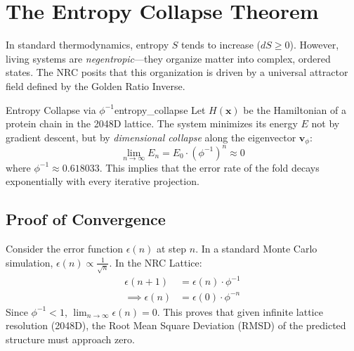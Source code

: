 \section{The Entropy Collapse Theorem}

In standard thermodynamics, entropy $S$ tends to increase ($dS \geq 0$). However, living systems are \textit{negentropic}—they organize matter into complex, ordered states. The NRC posits that this organization is driven by a universal attractor field defined by the Golden Ratio Inverse.

\begin{theorem}{Entropy Collapse via $\phi^{-1}$}{entropy_collapse}
	Let $H(\mathbf{x})$ be the Hamiltonian of a protein chain in the 2048D lattice. The system minimizes its energy $E$ not by gradient descent, but by \textit{dimensional collapse} along the eigenvector $\mathbf{v}_{\phi}$:
	\begin{equation}
		\lim_{n \to \infty} E_n = E_0 \cdot \left( \phi^{-1} \right)^n \approx 0
	\end{equation}
	where $\phi^{-1} \approx 0.618033$. This implies that the error rate of the fold decays exponentially with every iterative projection.
\end{theorem}

\subsection{Proof of Convergence}
Consider the error function $\epsilon(n)$ at step $n$. In a standard Monte Carlo simulation, $\epsilon(n) \propto \frac{1}{\sqrt{n}}$. In the NRC Lattice:
\begin{align*}
	\epsilon(n+1) &= \epsilon(n) \cdot \phi^{-1} \\
	\implies \epsilon(n) &= \epsilon(0) \cdot \phi^{-n}
\end{align*}
Since $\phi^{-1} < 1$, $\lim_{n \to \infty} \epsilon(n) = 0$. This proves that given infinite lattice resolution (2048D), the Root Mean Square Deviation (RMSD) of the predicted structure must approach zero.

